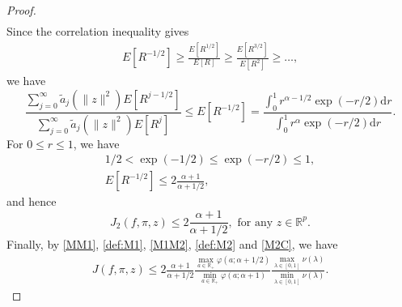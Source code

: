 \documentclass[preprint,11pt]{imsart}
\numberwithin{equation}{section}
\theoremstyle{plain}
\theoremstyle{definition}
\theoremstyle{remark}
\newcommand{\rd}{\mathrm{d}}
\begin{document}
\begin{proof}
\begin{align*}
\end{align*} 
 Since the correlation inequality gives
 \begin{align*}
 E[R^{-1/2}]\geq \frac{E[R^{1/2}]}{E[R]} \geq \frac{E[R^{3/2}]}{E[R^2]}\geq \dots,
 \end{align*}
we have
\begin{equation*}
\frac{\sum_{j=0}^\infty \tilde{a}_j(\|z\|^2) E[R^{j-1/2}]}
  {\sum_{j=0}^\infty \tilde{a}_j(\|z\|^2) E[R^{j}]}
  \leq E[R^{-1/2}]
  = \frac{\int_0^1r^{\alpha-1/2}\exp(-r/2) \rd r}{\int_0^1r^{\alpha}\exp(-r/2) \rd r}.
\end{equation*}
 For $0\leq r\leq 1$, we have
\begin{gather*}
1/2< \exp(-1/2)\leq \exp(-r/2)\leq 1, \\
 E[R^{-1/2}]\leq 2\frac{\alpha+1}{\alpha+1/2},
\end{gather*}
 and hence
\begin{equation}\label{M2C}
 J_2(f,\pi,z)\leq 2\frac{\alpha+1}{\alpha+1/2}, \text{ for any }z\in\mathbb{R}^p.
\end{equation}
 Finally, by \eqref{MM1}, \eqref{def:M1}, \eqref{M1M2}, \eqref{def:M2} and \eqref{M2C},
 we have
 \begin{align*}
J(f,\pi,z)\leq
 2\frac{\alpha+1}{\alpha+1/2}
\frac{\max_{a\in\mathbb{R}_+}\varphi(a;\alpha+1/2)}
  {\min_{a\in\mathbb{R}_+}\varphi(a;\alpha+1)}
  \frac{\max_{\lambda\in[0,1]}\nu(\lambda)}{\min_{\lambda\in[0,1]}\nu(\lambda)}.
 \end{align*}
\end{proof}
\end{document}
